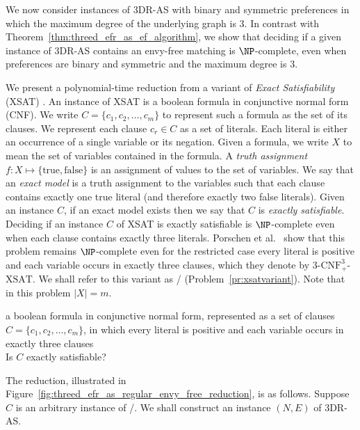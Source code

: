 We now consider instances of 3DR-AS with binary and symmetric preferences in which the maximum degree of the underlying graph is $3$. In contrast with Theorem~\ref{thm:threed_efr_as_ef_algorithm}, we show that deciding if a given instance of 3DR-AS contains an envy-free matching is $\NP$-complete, even when preferences are binary and symmetric and the maximum degree is $3$.

We present a polynomial-time reduction from a variant of \emph{Exact Satisfiability} (XSAT) \cite{GJ79}. An instance of XSAT is a boolean formula in conjunctive normal form (CNF). We write $C=\{ c_1, c_2, \dots, c_{m} \}$ to represent such a formula as the set of its clauses. We represent each clause $c_r\in C$ as a set of literals. Each literal is either an occurrence of a single variable or its negation. Given a formula, we write $X$ to mean the set of variables contained in the formula. A \emph{truth assignment} $f : X \mapsto \{\text{true}, \text{false}\}$ is an assignment of values to the set of variables. We say that an \emph{exact model} is a truth assignment to the variables such that each clause contains exactly one true literal (and therefore exactly two false literals). Given an instance $C$, if an exact model exists then we say that $C$ is \emph{exactly satisfiable}. Deciding if an instance $C$ of XSAT is exactly satisfiable is $\NP$-complete \cite{SchaeferSatComplexity78} even when each clause contains exactly three literals. Porschen et al.\ \cite[Lemma~5]{PSSW14} show that this problem remains $\NP$-complete even for the restricted case every literal is positive and each variable occurs in exactly three clauses, which they denote by $3$-$\text{CNF}_{+}^3$-$\text{XSAT}$. We shall refer to this variant as \porschenxsatvariant/ (Problem~\ref{pr:xsatvariant}). Note that in this problem $|X|=m$.

\begin{myproblem}[\porschenxsatvariant/]
\label{pr:xsatvariant}
\begin{samepage}
\begin{adjustwidth}{8pt}{8pt}
\inp a boolean formula in conjunctive normal form, represented as a set of clauses $C = \{ c_1, c_2, \dots, c_{m} \}$, in which every literal is positive and each variable occurs in exactly three clauses\\
\ques Is $C$ exactly satisfiable?
\end{adjustwidth}
\end{samepage}
\end{myproblem}
The reduction, illustrated in Figure~\ref{fig:threed_efr_as_regular_envy_free_reduction}, is as follows. Suppose $C$ is an arbitrary instance of \porschenxsatvariant/. We shall construct an instance $(N, E)$ of 3DR-AS.

